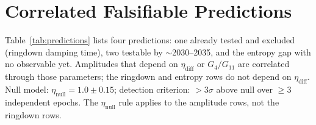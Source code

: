 \documentclass[11pt,a4paper]{article}
\begin{document}
\section{Correlated Falsifiable Predictions}
\label{sec:predictions}

Table~\ref{tab:predictions} lists four predictions: one already tested and excluded (ringdown damping time), two testable by $\sim$2030--2035, and the entropy gap with no observable yet.
Amplitudes that depend on $\eta_{\mathrm{diff}}$ or $G_4/G_{11}$ are correlated through those parameters; the ringdown and entropy rows do not depend on $\eta_{\mathrm{diff}}$.
Null model: $\eta_{\mathrm{null}} = 1.0\pm0.15$;
detection criterion: $>3\sigma$ above null over $\geq 3$ independent epochs.
The $\eta_{\mathrm{null}}$ rule applies to the amplitude rows, not the ringdown rows.
\end{document}
